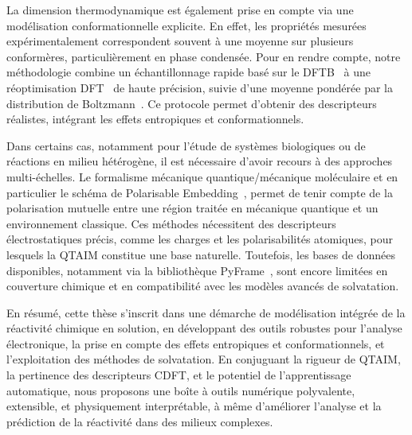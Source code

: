 La dimension thermodynamique est également prise en compte via une modélisation
conformationnelle explicite. En effet, les propriétés mesurées
expérimentalement correspondent souvent à une moyenne sur plusieurs
conformères, particulièrement en phase condensée. Pour en rendre compte, notre
méthodologie combine un échantillonnage rapide basé sur le
DFTB~\cite{ElstnerSeifert2014} à une réoptimisation DFT~\cite{Hohenberg1964} de
haute précision, suivie d'une moyenne pondérée par la distribution de
Boltzmann~\cite{Rowlinson2005}. Ce protocole permet d'obtenir des descripteurs
réalistes, intégrant les effets entropiques et conformationnels.

Dans certains cas, notamment pour l'étude de systèmes biologiques ou de
réactions en milieu hétérogène, il est nécessaire d'avoir recours à des
approches multi-échelles. Le formalisme mécanique quantique/mécanique
moléculaire et en particulier le schéma de Polarisable
Embedding~\cite{Beerepoot2016}, permet de tenir compte de la polarisation
mutuelle entre une région traitée en mécanique quantique et un environnement
classique.  Ces méthodes nécessitent des descripteurs électrostatiques précis,
comme les charges et les polarisabilités atomiques, pour lesquels la QTAIM
constitue une base naturelle. Toutefois, les bases de données disponibles,
notamment via la bibliothèque PyFrame~\cite{zenodo}, sont encore limitées en
couverture chimique et en compatibilité avec les modèles avancés de
solvatation.



En résumé, cette thèse s'inscrit dans une démarche de modélisation intégrée de
la réactivité chimique en solution, en développant des outils robustes pour
l'analyse électronique, la prise en compte des effets entropiques et
conformationnels, et l'exploitation des méthodes de solvatation. En conjuguant
la rigueur de \gls{QTAIM}, la pertinence des descripteurs \gls{CDFT}, et le potentiel de
l'apprentissage automatique, nous proposons une boîte à outils numérique
polyvalente, extensible, et physiquement interprétable, à même d'améliorer
l'analyse et la prédiction de la réactivité dans des milieux complexes.



